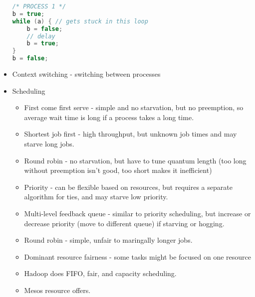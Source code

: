 \documentclass[10pt]{article}
\begin{document}
\begin{itemize}
\begin{lstlisting}[language=c]
/* PROCESS 1 */
b = true;
while (a) { // gets stuck in this loop
    b = false;
    // delay
    b = true;
}
b = false;
\end{lstlisting}
    \item Context switching - switching between processes
    \item Scheduling
    \begin{itemize}
        \item First come first serve - simple and no starvation, but no preemption, so average wait time is long if a process takes a long time.
        \item Shortest job first - high throughput, but unknown job times and may starve long jobs.
        \item Round robin - no starvation, but have to tune quantum length (too long without preemption isn't good, too short makes it inefficient)
        \item Priority - can be flexible based on resources, but requires a separate algorithm for ties, and may starve low priority.
        \item Multi-level feedback queue - similar to priority scheduling, but increase or decrease priority (move to different queue) if starving or hogging.
        \item Round robin - simple, unfair to maringally longer jobs.
        \item Dominant resource fairness - some tasks might be focused on one resource
        \item Hadoop does FIFO, fair, and capacity scheduling.
        \item Mesos resource offers.
    \end{itemize}
\end{itemize}
\end{document}

